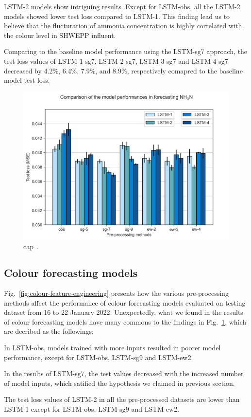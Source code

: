 LSTM-2 models show intriguing results. Except for LSTM-obs, all the LSTM-2 models showed lower test loss compared to LSTM-1. This finding lead us to believe that the flucturation of ammonia concentration is highly correlated with the colour level in SHWEPP influent.

Comparing to the baseline model performance using the LSTM-sg7 approach, the test loss values of LSTM-1-sg7, LSTM-2-sg7, LSTM-3-sg7 and LSTM-4-sg7 decreased by 4.2\%, 6.4\%, 7.9\%, and 8.9\%, respectively comapred to the baseline model test loss.

\begin{figure}[h]
    \centering
    \includegraphics[width=0.7\columnwidth]{imgs/results/feature-engineering/nh3-input-1-4-comparison.png}
    \caption{cap~.}
    \label{fig:nh3-feature-engineering}
 \end{figure}

\subsection{Colour forecasting models}
Fig.~\ref{fig:colour-feature-engineering} presents how the various pre-processing methods affect the performance of colour forecasting models evaluated on testing dataset from 16 to 22 January 2022. Unexpectedly, what we found in the results of colour forecasting models have many commons to the findings in Fig.~\ref{fig:nh3-feature-engineering}, which are decribed as the followings:

\noindent
\begin{myenumerate}
    \item In LSTM-obs, models trained with more inputs resulted in poorer model performance, except for LSTM-obs, LSTM-sg9 and LSTM-ew2.
    \item In the results of LSTM-sg7, the test values decreased with the increased number of model inputs, which satified the hypothesis we claimed in previous section.
    \item The test loss values of LSTM-2 in all the pre-processed datasets are lower than LSTM-1 except for LSTM-obs, LSTM-sg9 and LSTM-ew2.
\end{myenumerate}

